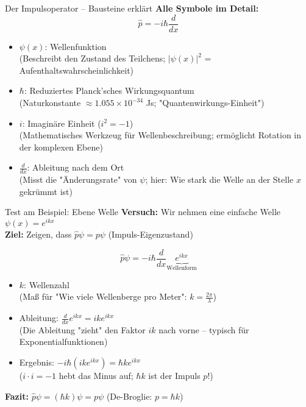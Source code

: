 \documentclass{beamer}
\begin{document}
    \begin{frame}{Der Impulsoperator – Bausteine erklärt}
        \textbf{Alle Symbole im Detail:}
        \[
            \hat{p} = -i\hbar \frac{d}{dx}
        \]
        \begin{itemize}
            \item $\psi(x)$: Wellenfunktion \\
            \footnotesize (Beschreibt den Zustand des Teilchens; $|\psi(x)|^2$ = Aufenthaltswahrscheinlichkeit)

            \item $\hbar$: Reduziertes Planck'sches Wirkungsquantum \\
            \footnotesize (Naturkonstante $\approx 1.055 \times 10^{-34}$ Js; "Quantenwirkungs-Einheit")

            \item $i$: Imaginäre Einheit ($i^2 = -1$) \\
            \footnotesize (Mathematisches Werkzeug für Wellenbeschreibung; ermöglicht Rotation in der komplexen Ebene)

            \item $\frac{d}{dx}$: Ableitung nach dem Ort \\
            \footnotesize (Misst die "Änderungsrate" von $\psi$; hier: Wie stark die Welle an der Stelle $x$ gekrümmt ist)
        \end{itemize}
    \end{frame}

    \begin{frame}{Test am Beispiel: Ebene Welle}
        \textbf{Versuch:} Wir nehmen eine einfache Welle $\psi(x) = e^{ikx}$ \\
        \textbf{Ziel:} Zeigen, dass $\hat{p}\psi = p\psi$ (Impuls-Eigenzustand)

        \[
            \hat{p}\psi = -i\hbar \frac{d}{dx} \underbrace{e^{ikx}}_{\text{Wellenform}}
        \]

        \begin{itemize}
            \item $k$: Wellenzahl \\
            \footnotesize (Maß für "Wie viele Wellenberge pro Meter": $k = \frac{2\pi}{\lambda}$)

            \item Ableitung: $\frac{d}{dx}e^{ikx} = ik e^{ikx}$ \\
            \footnotesize (Die Ableitung "zieht" den Faktor $ik$ nach vorne – typisch für Exponentialfunktionen)

            \item Ergebnis: $-i\hbar (ik e^{ikx}) = \hbar k e^{ikx}$ \\
            \footnotesize ($i \cdot i = -1$ hebt das Minus auf; $\hbar k$ ist der Impuls $p$!)
        \end{itemize}

        \textbf{Fazit:} $\hat{p}\psi = (\hbar k)\psi = p\psi$ \quad (De-Broglie: $p = \hbar k$)
    \end{frame}
\end{document}

